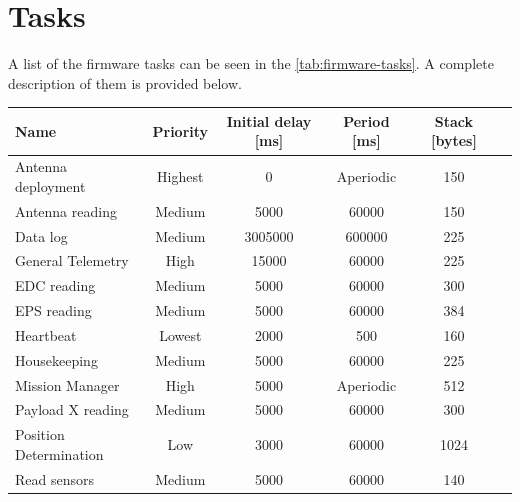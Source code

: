 \section{Tasks}

A list of the firmware tasks can be seen in the \autoref{tab:firmware-tasks}. A complete description of them is provided below.

\begin{table}[!t]
	\centering
	\begin{tabular}{lccccc}
		\toprule[1.5pt]
		\textbf{Name}          & \textbf{Priority} & \textbf{Initial delay [ms]} & \textbf{Period [ms]} & \textbf{Stack [bytes]} \\
		\midrule
		Antenna deployment     & Highest           & 0                           & Aperiodic            & 150                    \\
		Antenna reading        & Medium            & 5000                        & 60000                & 150                    \\
		Data log               & Medium            & 3005000                     & 600000               & 225                    \\
		General Telemetry      & High              & 15000                       & 60000                & 225                    \\
		EDC reading            & Medium            & 5000                        & 60000                & 300                    \\
		EPS reading            & Medium            & 5000                        & 60000                & 384                    \\
		Heartbeat              & Lowest            & 2000                        & 500                  & 160                    \\
		Housekeeping           & Medium            & 5000                        & 60000                & 225                    \\
		Mission Manager        & High              & 5000                        & Aperiodic            & 512                    \\
		Payload X reading      & Medium            & 5000                        & 60000                & 300                    \\
		Position Determination & Low               & 3000                        & 60000                & 1024                   \\
		Read sensors           & Medium            & 5000                        & 60000                & 140                    \\

\end{tabular}
\end{table}

